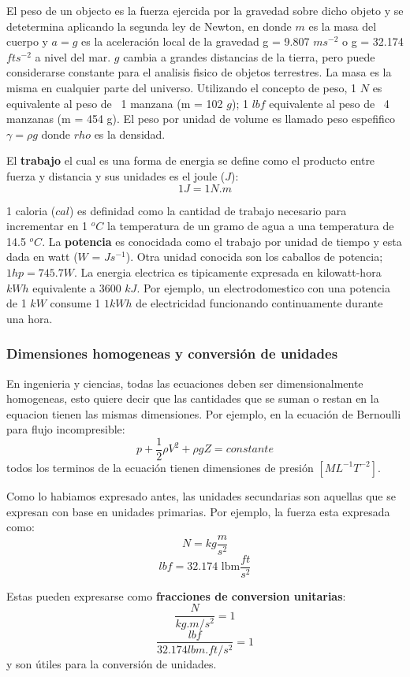 \documentclass[10pt, oneside]{article}
\begin{document}
El peso de un objecto es la fuerza ejercida por la gravedad sobre dicho objeto y se detetermina aplicando la segunda ley de Newton, en donde $m$ es la masa del cuerpo y $a=g$ es la aceleraci\'on local de la gravedad g = 9.807 $m s^{-2}$ o g = 32.174 $ft s^{-2}$ a nivel del mar. $g$ cambia a grandes distancias de la tierra, pero puede considerarse constante para el analisis fisico de objetos terrestres. La masa es la misma en cualquier parte del universo. Utilizando el concepto de peso, 1 $N$ es equivalente al peso de ~1 manzana (m = 102 $g$); 1 $lbf$ equivalente al peso de ~4 manzanas (m = 454 g). El peso por unidad de volume es llamado peso espefifico $\gamma = \rho g$ donde $rho$ es la densidad. 

El \textbf{trabajo} el cual es una forma de energia se define como el producto entre fuerza y distancia y sus unidades es el  joule ($J$):
$$
1J = 1 N.m
$$

1 caloria ($cal$) es definidad como la cantidad de trabajo necesario para incrementar en 1 $^oC$ la temperatura de un gramo de agua a una temperatura de 14.5 $^oC$. La \textbf{potencia} es conocidada como el trabajo por unidad de tiempo y esta dada en watt ($W$ = $J s^{-1}$). Otra unidad conocida son los caballos de potencia; $1 hp = 745.7 W$. La energia electrica es tipicamente expresada en kilowatt-hora $kWh$ equivalente a 3600 $kJ$. Por ejemplo, un electrodomestico con una potencia de 1 $kW$ consume 1 $1kWh$ de electricidad funcionando continuamente durante una hora.


\subsubsection{Dimensiones homogeneas y conversi\'on de unidades}
En ingenieria y ciencias, todas las ecuaciones deben ser dimensionalmente homogeneas, esto quiere decir que las cantidades que se suman o restan en la equacion tienen las mismas dimensiones. Por ejemplo, en la ecuaci\'on de Bernoulli para flujo incompresible:
$$
p + \frac{1}{2} \rho V^2 + \rho g Z = constante
$$
todos los terminos de la ecuaci\'on tienen dimensiones de presi\'on $[ML^{-1}T^{-2}]$.

Como lo habiamos expresado antes, las unidades secundarias son aquellas que se expresan con base en unidades primarias. Por ejemplo, la fuerza esta expresada como:
$$
N=kg\frac{m}{s^2}
$$
$$
lbf = 32.174 \text{ lbm$\frac{ft}{s^2}$}
$$

Estas pueden expresarse como \textbf{fracciones de conversion unitarias}:
$$
\frac{N}{kg.m/s^2} = 1
$$
$$
\frac{lbf}{32.174lbm.ft/s^{2}} = 1
$$
y son \'utiles para la conversi\'on de unidades.
\end{document}
